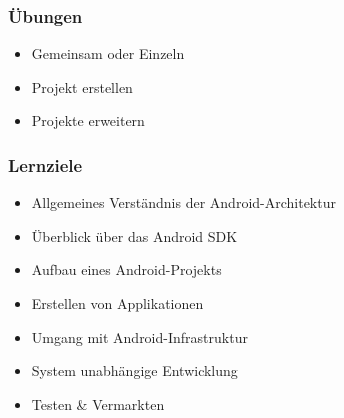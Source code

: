 \begin{frame}
   \frametitle{Übungen}
   \begin{itemize}
		\item Gemeinsam oder Einzeln
		\item Projekt erstellen
		\item Projekte erweitern
   \end{itemize}
\end{frame}

\begin{frame}
   \frametitle{Lernziele}
   \begin{itemize}
		\item Allgemeines Verständnis der Android-Architektur
		\item Überblick über das Android SDK
		\item Aufbau eines Android-Projekts
		\item Erstellen von Applikationen
		\item Umgang mit Android-Infrastruktur
		\item System unabhängige Entwicklung
		\item Testen \& Vermarkten
   \end{itemize}
\end{frame}
